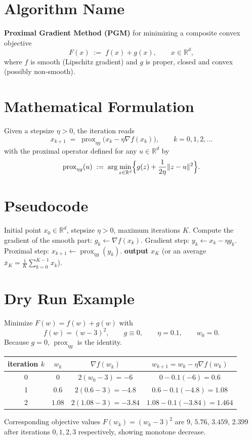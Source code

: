 \documentclass{article}
\newcommand{\prox}{\operatorname{prox}}
\newcommand{\R}{\mathbb{R}}
\begin{document}
\section*{Algorithm Name}
\textbf{Proximal Gradient Method (PGM)} for minimizing a composite convex objective
\[
F(x)\;:=\;f(x)+g(x),\qquad x\in\R^{d},
\]
where $f$ is smooth (Lipschitz gradient) and $g$ is proper, closed and convex (possibly non‑smooth).

\section*{Mathematical Formulation}
Given a stepsize $\eta>0$, the iteration reads
\begin{equation}
\label{eq:update}
x_{k+1}\;=\;\prox_{\eta g}\!\bigl(x_{k}-\eta\nabla f(x_{k})\bigr),
\qquad k=0,1,2,\dots
\end{equation}
with the proximal operator defined for any $u\in\R^{d}$ by
\[
\prox_{\eta g}(u)\;:=\;\arg\min_{z\in\R^{d}}\Bigl\{ g(z)+\frac{1}{2\eta}\|z-u\|^{2}\Bigr\}.
\]

\section*{Pseudocode}
\begin{algorithm}[H]
\caption{Proximal Gradient Method}
\begin{algorithmic}[1]
\Require Initial point $x_{0}\in\R^{d}$, stepsize $\eta>0$, maximum iterations $K$.
    \State Compute the gradient of the smooth part: $g_{k}\gets \nabla f(x_{k})$.
    \State Gradient step: $y_{k}\gets x_{k}-\eta g_{k}$.
    \State Proximal step: $x_{k+1}\gets \prox_{\eta g}(y_{k})$.
\EndFor
\State \textbf{output} $x_{K}$ (or an average $\bar x_{K}=\frac1K\sum_{k=0}^{K-1}x_{k}$).
\end{algorithmic}
\end{algorithm}

\section*{Dry Run Example}
Minimize $F(w)=f(w)+g(w)$ with  
\[
f(w)=(w-3)^{2},\qquad g\equiv0,\qquad \eta=0.1,\qquad w_{0}=0.
\]
Because $g=0$, $\prox_{\eta g}$ is the identity.

\begin{center}
\begin{tabular}{c|c|c|c}
iteration $k$ & $w_{k}$ & $\nabla f(w_{k})$ & $w_{k+1}=w_{k}-\eta\nabla f(w_{k})$\\ \hline
0 & $0$ & $2(w_{0}-3)=-6$ & $0-0.1(-6)=0.6$\\
1 & $0.6$ & $2(0.6-3)=-4.8$ & $0.6-0.1(-4.8)=1.08$\\
2 & $1.08$ & $2(1.08-3)=-3.84$ & $1.08-0.1(-3.84)=1.464$\\
\end{tabular}
\end{center}
Corresponding objective values $F(w_{k})=(w_{k}-3)^{2}$ are $9$, $5.76$, $3.459$, $2.399$ after iterations $0,1,2,3$ respectively, showing monotone decrease.
\end{document}
